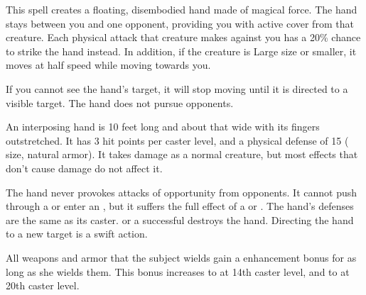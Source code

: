 \spellrng{\rngmed}
\spelldur{\durshort \dismissable}
\begin{spelleffect}
    This spell creates a floating, disembodied hand made of magical force. The hand stays between you and one opponent, providing you with active cover from that creature. Each physical attack that creature makes against you has a 20\% chance to strike the hand instead. In addition, if the creature is Large size or smaller, it moves at half speed while moving towards you. 
    \par If you cannot see the hand's target, it will stop moving until it is directed to a visible target. The hand does not pursue opponents.
    \par An interposing hand is 10 feet long and about that wide with its fingers outstretched. It has 3 hit points per caster level, and a physical defense of 15 ( size,  natural armor). It takes damage as a normal creature, but most effects that don't cause damage do not affect it.
\end{spelleffect}
\begin{spellnotes}
    \par The hand never provokes attacks of opportunity from opponents. It cannot push through a  or enter an , but it suffers the full effect of a  or . The hand's defenses are the same as its caster.
     or a successful  destroys the hand. Directing the hand to a new target is a swift action.
\end{spellnotes}

\spelldur{\durshort}
\begin{spelleffect}
    All weapons and armor that the subject wields gain a  enhancement bonus for as long as she wields them. This bonus increases to  at 14th caster level, and to  at 20th caster level.
\end{spelleffect}


